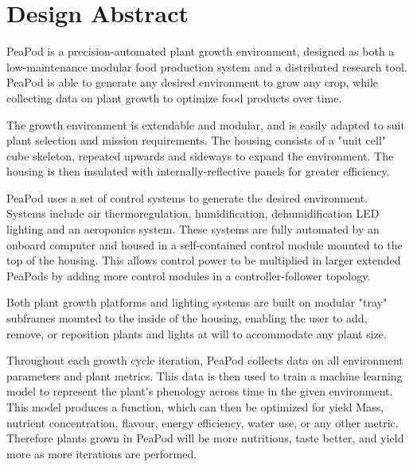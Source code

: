 \documentclass{report}
\begin{document}
\tableofcontents
\newpage

\section{Design Abstract}

PeaPod is a precision-automated plant growth environment, designed as both a low-maintenance modular food production system and a distributed research tool. PeaPod is able to generate any desired environment to grow any crop, while collecting data on plant growth to optimize food products over time.

The growth environment is extendable and modular, and is easily adapted to suit plant selection and mission requirements. The housing consists of a "unit cell" cube skeleton, repeated upwards and sideways to expand the environment. The housing is then insulated with internally-reflective panels for greater efficiency.

PeaPod uses a set of control systems to generate the desired environment. Systems include air thermoregulation, humidification, dehumidification LED lighting and an aeroponics system. These systems are fully automated by an onboard computer and housed in a self-contained control module mounted to the top of the housing. This allows control power to be multiplied in larger extended PeaPods by adding more control modules in a controller-follower topology.

Both plant growth platforms and lighting systems are built on modular "tray" subframes mounted to the inside of the housing, enabling the user to add, remove, or reposition plants and lights at will to accommodate any plant size.

Throughout each growth cycle iteration, PeaPod collects data on all environment parameters and plant metrics. This data is then used to train a machine learning model to represent the plant's phenology across time in the given environment. This model produces a function, which can then be optimized for yield Mass, nutrient concentration, flavour, energy efficiency, water use, or any other metric. Therefore plants grown in PeaPod will be more nutritious, taste better, and yield more as more iterations are performed.
\end{document}
